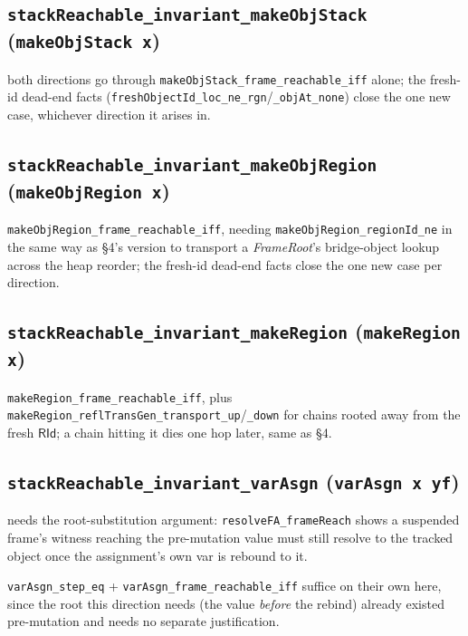 \documentclass[11pt]{article}
\newcommand{\op}[1]{\texttt{#1}}
\newcommand{\thm}[1]{\textbf{\texttt{#1}}}
\begin{document}
\subsection{\thm{stackReachable\_invariant\_makeObjStack} (\op{makeObjStack x})}
\begin{description}[nosep]
  \item[Forward, backward] both directions go through \texttt{makeObjStack\_frame\_reachable\_iff}
    alone; the fresh-id dead-end facts (\texttt{freshObjectId\_loc\_ne\_rgn}/\texttt{\_objAt\_none})
    close the one new case, whichever direction it arises in.
\end{description}

\subsection{\thm{stackReachable\_invariant\_makeObjRegion} (\op{makeObjRegion x})}
\begin{description}[nosep]
  \item[Forward, backward] \texttt{makeObjRegion\_frame\_reachable\_iff}, needing
    \texttt{makeObjRegion\_regionId\_ne} in the same way as \S4's version to transport a
    \textit{FrameRoot}'s bridge-object lookup across the heap reorder; the fresh-id dead-end facts
    close the one new case per direction.
\end{description}

\subsection{\thm{stackReachable\_invariant\_makeRegion} (\op{makeRegion x})}
\begin{description}[nosep]
  \item[Forward, backward] \texttt{makeRegion\_frame\_reachable\_iff}, plus
    \texttt{makeRegion\_reflTransGen\_transport\_up}/\texttt{\_down} for chains rooted away from
    the fresh $\mathsf{RId}$; a chain hitting it dies one hop later, same as \S4.
\end{description}

\subsection{\thm{stackReachable\_invariant\_varAsgn} (\op{varAsgn x yf})}
\begin{description}[nosep]
  \item[Forward] needs the root-substitution argument: \texttt{resolveFA\_frameReach} shows a
    suspended frame's witness reaching the pre-mutation value must still resolve to the tracked
    object once the assignment's own var is rebound to it.
  \item[Backward] \texttt{varAsgn\_step\_eq} + \texttt{varAsgn\_frame\_reachable\_iff} suffice on
    their own here, since the root this direction needs (the value \emph{before} the rebind)
    already existed pre-mutation and needs no separate justification.
\end{description}
\end{document}
